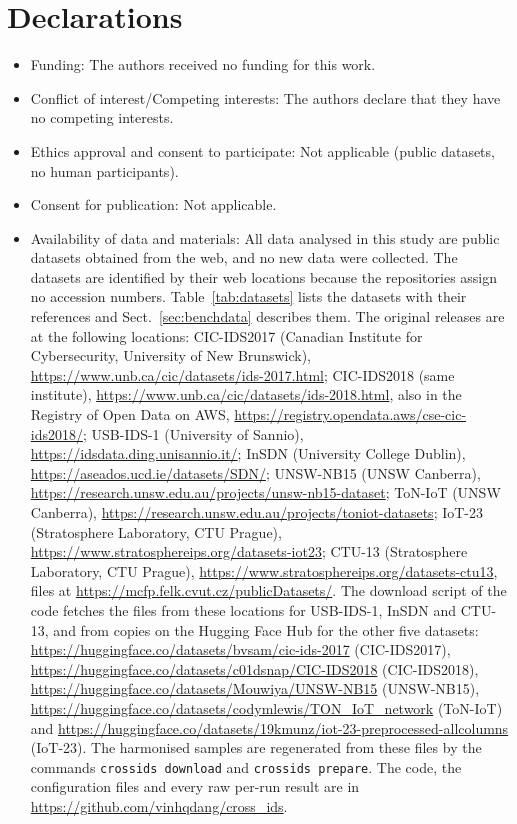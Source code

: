 \documentclass[pdflatex,sn-mathphys-num]{sn-jnl}%
\begin{document}
\backmatter

\section*{Declarations}

\begin{itemize}
\item Funding: The authors received no funding for this work.
\item Conflict of interest/Competing interests: The authors declare that they have no competing interests.
\item Ethics approval and consent to participate: Not applicable (public datasets, no human participants).
\item Consent for publication: Not applicable.
\item Availability of data and materials: All data analysed in this study are public datasets obtained from the web, and no new data were collected. The datasets are identified by their web locations because the repositories assign no accession numbers. Table~\ref{tab:datasets} lists the datasets with their references and Sect.~\ref{sec:benchdata} describes them. The original releases are at the following locations: CIC-IDS2017 (Canadian Institute for Cybersecurity, University of New Brunswick), \url{https://www.unb.ca/cic/datasets/ids-2017.html}; CIC-IDS2018 (same institute), \url{https://www.unb.ca/cic/datasets/ids-2018.html}, also in the Registry of Open Data on AWS, \url{https://registry.opendata.aws/cse-cic-ids2018/}; USB-IDS-1 (University of Sannio), \url{https://idsdata.ding.unisannio.it/}; InSDN (University College Dublin), \url{https://aseados.ucd.ie/datasets/SDN/}; UNSW-NB15 (UNSW Canberra), \url{https://research.unsw.edu.au/projects/unsw-nb15-dataset}; ToN-IoT (UNSW Canberra), \url{https://research.unsw.edu.au/projects/toniot-datasets}; IoT-23 (Stratosphere Laboratory, CTU Prague), \url{https://www.stratosphereips.org/datasets-iot23}; CTU-13 (Stratosphere Laboratory, CTU Prague), \url{https://www.stratosphereips.org/datasets-ctu13}, files at \url{https://mcfp.felk.cvut.cz/publicDatasets/}. The download script of the code fetches the files from these locations for USB-IDS-1, InSDN and CTU-13, and from copies on the Hugging Face Hub for the other five datasets: \url{https://huggingface.co/datasets/bvsam/cic-ids-2017} (CIC-IDS2017), \url{https://huggingface.co/datasets/c01dsnap/CIC-IDS2018} (CIC-IDS2018), \url{https://huggingface.co/datasets/Mouwiya/UNSW-NB15} (UNSW-NB15), \url{https://huggingface.co/datasets/codymlewis/TON_IoT_network} (ToN-IoT) and \url{https://huggingface.co/datasets/19kmunz/iot-23-preprocessed-allcolumns} (IoT-23). The harmonised samples are regenerated from these files by the commands \texttt{crossids download} and \texttt{crossids prepare}. The code, the configuration files and every raw per-run result are in \url{https://github.com/vinhqdang/cross_ids}.

\end{itemize}
\end{document}
